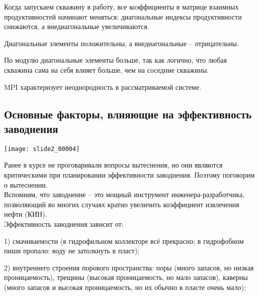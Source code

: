 \documentclass[main.tex]{subfiles}
\begin{document}
Когда запускаем скважину в работу, все коэффициенты в матрице взаимных продуктивностей начинают меняться: диагональные индексы продуктивности снижаются, а внедиагональные увеличиваются.

Диагональные элементы положительны, а внедиагональные -- отрицательны.

По модулю диагональные элементы больше, так как логично, что любая скважина сама на себя влияет больше, чем на соседние скважины.

MPI характеризует неоднородность в рассматриваемой системе.











\subsection{Основные факторы, влияющие на эффективность заводнения}

\texttt{[image: slide2\_00004]}

Ранее в курсе не проговаривали вопросы вытеснения, но они являются критическими при планировании эффективности заводнения. Поэтому поговорим о вытеснении.\\

Вспомним, что заводнение -- это мощный инструмент инженера-разработчика, позволяющий во многих случаях кратно увеличить коэффициент извлечения нефти (КИН). \\

Эффективность заводнения зависит от:

1) смачиваемости (в гидрофильном коллекторе всё прекрасно; в гидрофобном пиши пропало: воду не затолкнуть в пласт);

2) внутреннего строения порового пространства: поры (много запасов, но низкая проницаемость), трещины (высокая проницаемость, но мало запасов), каверны (много запасов и высокая проницаемость, но их обычно в пласте очень мало);
\end{document}
